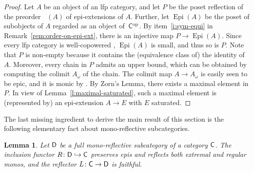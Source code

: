 \documentclass[a4paper,10pt,reqno]{amsart}
\newtheorem{lemma}[theorem]{Lemma}
\theoremstyle{definition}
\theoremstyle{remark}
\newcommand{\cat}{{\sf C}}								%
\newcommand{\catt}{{\sf D}}								%
\newcommand{\into}{\hookrightarrow}						%
\newcommand{\op}{{\mathrm{op}}}						%
\DeclareMathOperator{\EExt}{Ext_{p}}					%
\DeclareMathOperator{\Epi}{Epi}						%
\begin{document}
\begin{proof}
Let $A$ be an object of an lfp category, and let $P$ be the poset reflection of the preorder $\EExt(A)$ of epi-extensions of $A$. Further, let $\Epi(A)$ be the poset of subobjects of $A$ regarded as an object of~$\cat^{\op}$. By item~\ref{i:sym-equi} in Remark~\ref{rem:order-on-epi-ext}, there is an injective map $P\to \Epi(A)$. Since every lfp category is well-copowered \cite[Theorem~1.58]{ar94book}, $\Epi(A)$ is small, and thus so is $P$. Note that $P$ is non-empty because it contains the (equivalence class of) the identity of $A$. Moreover, every chain in $P$ admits an upper bound, which can be obtained by computing the colimit $A_{\omega}$ of the chain. The colimit map $A\to A_{\omega}$ is easily seen to be epic, and it is monic by \cite[Proposition~1.62]{ar94book}. By Zorn's Lemma, there exists a maximal element in $P$. In view of Lemma~\ref{l:maximal-saturated}, such a maximal element is (represented by) an epi-extension $A\to E$ with $E$ saturated. 
\end{proof}
 
The last missing ingredient to derive the main result of this section is the following elementary fact about mono-reflective subcategories.
%
\begin{lemma}\label{l:basic-props-mono-reflections}
Let $\catt$ be a full mono-reflective subcategory of a category $\cat$. The inclusion functor $R\colon\catt\into\cat$ preserves epis and reflects both extremal and regular monos,
and the reflector $L\colon \cat\to\catt$ is faithful.
\end{lemma}
\end{document}
